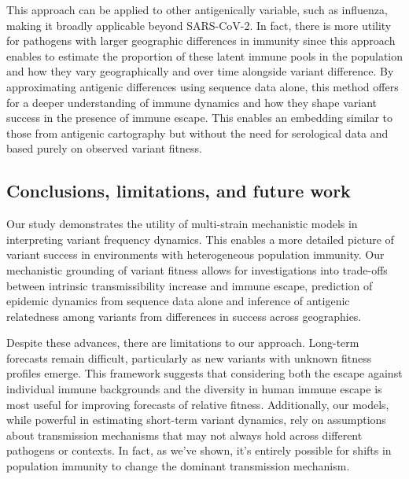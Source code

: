 \documentclass[11pt,oneside,letterpaper]{article}
\begin{document}
This approach can be applied to other antigenically variable, such as influenza, making it broadly applicable beyond SARS-CoV-2.
In fact, there is more utility for pathogens with larger geographic differences in immunity since this approach enables to estimate the proportion of these latent immune pools in the population and how they vary geographically and over time alongside variant difference.
By approximating antigenic differences using sequence data alone, this method offers for a deeper understanding of immune dynamics and how they shape variant success in the presence of immune escape.
This enables an embedding similar to those from antigenic cartography but without the need for serological data and based purely on observed variant fitness.

\subsection*{Conclusions, limitations, and future work}

Our study demonstrates the utility of multi-strain mechanistic models in interpreting variant frequency dynamics.
This enables a more detailed picture of variant success in environments with heterogeneous population immunity.
Our mechanistic grounding of variant fitness allows for investigations into trade-offs between intrinsic transmissibility increase and immune escape, prediction of epidemic dynamics from sequence data alone and inference of antigenic relatedness among variants from differences in success across geographies.


Despite these advances, there are limitations to our approach.
Long-term forecasts remain difficult, particularly as new variants with unknown fitness profiles emerge.
This framework suggests that considering both the escape against individual immune backgrounds and the diversity in human immune escape is most useful for improving forecasts of relative fitness.
Additionally, our models, while powerful in estimating short-term variant dynamics, rely on assumptions about transmission mechanisms that may not always hold across different pathogens or contexts.
In fact, as we've shown, it's entirely possible for shifts in population immunity to change the dominant transmission mechanism.
\end{document}
